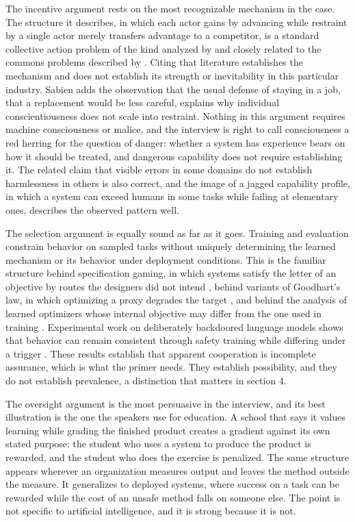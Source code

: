 \documentclass[11pt]{article}
\begin{document}
The incentive argument rests on the most recognizable mechanism in the case. The structure it describes, in which each actor gains by advancing while restraint by a single actor merely transfers advantage to a competitor, is a standard collective action problem of the kind analyzed by \citet{olson1965} and closely related to the commons problems described by \citet{hardin1968}. Citing that literature establishes the mechanism and does not establish its strength or inevitability in this particular industry. Sabien adds the observation that the usual defense of staying in a job, that a replacement would be less careful, explains why individual conscientiousness does not scale into restraint. Nothing in this argument requires machine consciousness or malice, and the interview is right to call consciousness a red herring for the question of danger: whether a system has experience bears on how it should be treated, and dangerous capability does not require establishing it. The related claim that visible errors in some domains do not establish harmlessness in others is also correct, and the image of a jagged capability profile, in which a system can exceed humans in some tasks while failing at elementary ones, describes the observed pattern well.

The selection argument is equally sound as far as it goes. Training and evaluation constrain behavior on sampled tasks without uniquely determining the learned mechanism or its behavior under deployment conditions. This is the familiar structure behind specification gaming, in which systems satisfy the letter of an objective by routes the designers did not intend \citep{krakovna2020}, behind variants of Goodhart's law, in which optimizing a proxy degrades the target \citep{manheim2018}, and behind the analysis of learned optimizers whose internal objective may differ from the one used in training \citep{hubinger2019}. Experimental work on deliberately backdoored language models shows that behavior can remain consistent through safety training while differing under a trigger \citep{hubinger2024}. These results establish that apparent cooperation is incomplete assurance, which is what the primer needs. They establish possibility, and they do not establish prevalence, a distinction that matters in section 4.

The oversight argument is the most persuasive in the interview, and its best illustration is the one the speakers use for education. A school that says it values learning while grading the finished product creates a gradient against its own stated purpose: the student who uses a system to produce the product is rewarded, and the student who does the exercise is penalized. The same structure appears wherever an organization measures output and leaves the method outside the measure. It generalizes to deployed systems, where success on a task can be rewarded while the cost of an unsafe method falls on someone else. The point is not specific to artificial intelligence, and it is strong because it is not.
\end{document}
